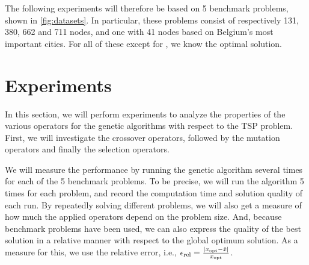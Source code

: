 ﻿\documentclass[a4paper,english,11pt,]{scrartcl}
\begin{document}
The following experiments will therefore be based on 5 benchmark problems, shown in \autoref{fig:datasets}. In particular, these problems consist of respectively 131, 380, 662 and 711 nodes, and one with 41 nodes based on Belgium's most important cities. For all of these except for , we know the optimal solution.


%  


\section{Experiments}
% 
In this section, we will perform experiments to analyze the properties of the various operators for the genetic algorithms with respect to the TSP problem. First, we will investigate the crossover operators, followed by the mutation operators and finally the selection operators.


We will measure the performance by running the genetic algorithm several times for each of the 5 benchmark problems. To be precise, we will run the algorithm 5 times for each problem, and record the computation time and solution quality of each run.  By repeatedly solving different problems, we will also get a measure of how much the applied operators depend on the problem size. And, because benchmark problems have been used, we can also express the quality of the best solution in a relative manner with respect to the global optimum solution. As a measure for this, we use the relative error, i.e., $\epsilon_\textnormal{rel} = \frac{|x_\textnormal{opt} - \hat{x}|}{x_\textnormal{opt}}$.
\end{document}
